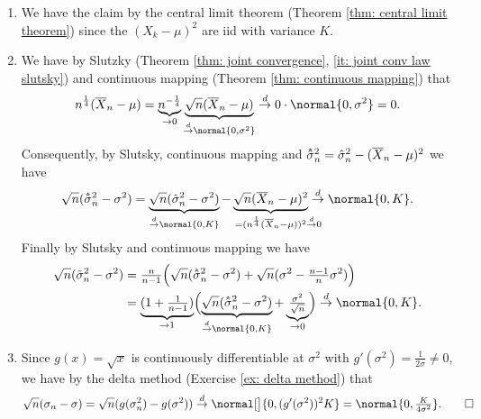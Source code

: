 \begin{solution}
   \begin{enumerate}[wide=0pt]
        \item[\ref{it: (normality of variance estimation) theoretical
        estimator}] We have the claim by the central limit theorem (Theorem
        \ref{thm: central limit theorem}) since the \((X_k - \mu)^2\) are iid
        with variance \(K\).

        \item[\ref{it: (normality of variance estimation) realistic estimator}]
        We have by Slutzky (Theorem \ref{thm: joint convergence}, \ref{it: joint conv law slutsky})
        and continuous mapping (Theorem \ref{thm: continuous mapping}) that
        \[
            n^{\frac14} (\mean{X}_n - \mu)
            = \underbrace{n^{-\frac14}}_{\to 0} \underbrace{\sqrt{n}(\mean{X}_n - \mu)}_{\overset{d}\to \normal{0, \sigma^2}}
            \overset{d}\to 0 \cdot \normal{0, \sigma^2} = 0.
        \]
        Consequently, by Slutsky, continuous mapping and \(\hhat{\sigma}_n^2=\hat\sigma_n^2 - (\mean{X}_n - \mu)^2\) we have
        \[
            \sqrt{n}(\hhat{\sigma}_n^2 - \sigma^2)
            = \underbrace{\sqrt{n}(\hat\sigma_n^2 - \sigma^2)}_{\overset{d}\to \normal{0, K}}
            - \underbrace{\sqrt{n}(\mean{X}_n - \mu)^2}_{=(n^{\frac14}(\mean{X}_n - \mu))^2 \mathrlap{\overset{d}\to 0}}
            \overset{d}\to \normal{0, K}.
        \]
        Finally by Slutsky and continuous mapping we have
        \begin{align*}
            \sqrt{n} (\tilde\sigma_n^2 - \sigma^2)
            &= \tfrac{n}{n-1}\Bigl( \sqrt{n}(\hhat{\sigma}_n^2 - \sigma^2) + \sqrt{n}(\sigma^2 - \tfrac{n-1}n \sigma^2)\Bigr)
            \\
            &= \underbrace{(1 + \tfrac1{n-1})}_{\to 1}\Bigl(\underbrace{\sqrt{n}(\hhat{\sigma}_n^2 - \sigma^2)}_{\overset{d}\to \normal{0, K}} + \underbrace{\tfrac{\sigma^2}{\sqrt{n}}}_{\to 0}\Bigr)
            \overset{d}\to \normal{0, K}.
        \end{align*}
        \item[\ref{it: (normality of variance estimation) standard deviation}]
        Since \(g(x) = \sqrt{x}\) is continuously differentiable at \(\sigma^2\) with \(g'(\sigma^2) = \frac{1}{2\sigma}\neq 0\), we have by the delta method (Exercise \ref{ex: delta method}) that
        \[
            \sqrt{n}(\sigma_n - \sigma)
            = \sqrt{n}(g(\sigma_n^2) - g(\sigma^2))
            \overset{d}\to \normal[\big]{0, (g'(\sigma^2))^2 K}
            = \normal{0, \tfrac{K}{4\sigma^2}}.
            \qedhere
        \]
        \end{enumerate} 
\end{solution}
